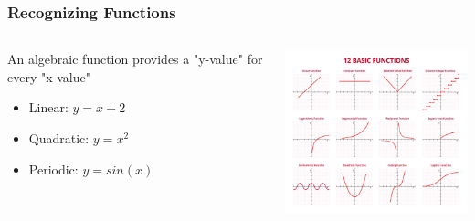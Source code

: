 \documentclass{beamer}
\begin{document}
\begin{frame}\frametitle{Recognizing Functions}
\begin{columns}
\begin{column}{4.5cm}
An algebraic function provides a "y-value" for every "x-value"
\begin{itemize}
\item Linear: $y = x + 2$
\item Quadratic: $y = x^2$
\item Periodic: $y = sin(x)$
\end{itemize}
\end{column}
\begin{column}{7cm}
\begin{center}
\includegraphics[width=7cm]{fig/basicfun.jpg}
\end{center}
\end{column}
\end{columns}
\end{frame}
\end{document}
